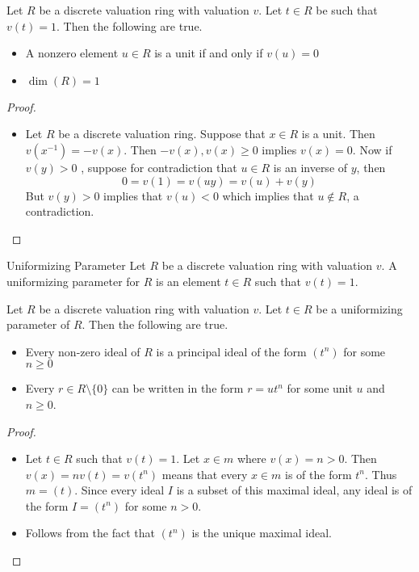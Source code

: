 \documentclass[a4paper]{article}
\begin{document}
\begin{prp}{}{} Let $R$ be a discrete valuation ring with valuation $v$. Let $t\in R$ be such that $v(t)=1$. Then the following are true. 
\begin{itemize}
\item A nonzero element $u\in R$ is a unit if and only if $v(u)=0$
\item $\dim(R)=1$
\end{itemize}\tcbline
\begin{proof}~\\
\begin{itemize}
\item Let $R$ be a discrete valuation ring. Suppose that $x\in R$ is a unit. Then $v(x^{-1})=-v(x)$. Then $-v(x),v(x)\geq 0$ implies $v(x)=0$. Now if $v(y)>0$ , suppose for contradiction that $u\in R$ is an inverse of $y$, then $$0=v(1)=v(uy)=v(u)+v(y)$$ But $v(y)>0$ implies that $v(u)<0$ which implies that $u\notin R$, a contradiction. 
\end{itemize}
\end{proof}
\end{prp}

\begin{defn}{Uniformizing Parameter}{} Let $R$ be a discrete valuation ring with valuation $v$. A uniformizing parameter for $R$ is an element $t\in R$ such that $v(t)=1$. 
\end{defn}

\begin{prp}{}{} Let $R$ be a discrete valuation ring with valuation $v$. Let $t\in R$ be a uniformizing parameter of $R$. Then the following are true. 
\begin{itemize}
\item Every non-zero ideal of $R$ is a principal ideal of the form $(t^n)$ for some $n\geq 0$
\item Every $r\in R\setminus\{0\}$ can be written in the form $r=ut^n$ for some unit $u$ and $n\geq 0$. 
\end{itemize}\tcbline
\begin{proof}~\\
\begin{itemize}
\item Let $t\in R$ such that $v(t)=1$. Let $x\in m$ where $v(x)=n>0$. Then $v(x)=nv(t)=v(t^n)$ means that every $x\in m$ is of the form $t^n$. Thus $m=(t)$. Since every ideal $I$ is a subset of this maximal ideal, any ideal is of the form $I=(t^n)$ for some $n>0$. 
\item Follows from the fact that $(t^n)$ is the unique maximal ideal. 
\end{itemize}
\end{proof}
\end{prp}
\end{document}
